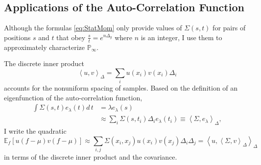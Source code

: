\documentclass[]{article}
\newcommand{\field}[1]{\mathbb{#1}}
\newcommand\Polytope[1]{\field{P}_{#1}}
\newcommand\PolytopeInf{\Polytope{\infty}}
\newcommand{\EV}[2]{\field{E}_{#1}\left[#2\right]}
\newcommand\inner[2]{\left<#1,#2\right>}
\newcommand\logx{y}
\begin{document}
\subsection{Applications of the Auto-Correlation Function}
\label{sec:acf}

Although the formulas \eqref{eq:StatMom} only provide values of
$\Sigma(s,t)$ for pairs of positions $s$ and $t$ that obey
$\frac{s}{t} = e^{n\Delta_\logx }$ where $n$ is an integer, I use them to
approximately characterize $\PolytopeInf$.

The discrete inner product
\begin{equation}
  \label{eq:inner}
  \inner{u}{v}_\Delta = \sum_i u(x_i) v(x_i) \Delta_i
\end{equation}
accounts for the nonuniform spacing of samples.  Based on the
definition of an eigenfunction of the auto-correlation function,
\begin{align*}
  \int \Sigma(s,t) e_\lambda(t) d\, t &= \lambda e_\lambda(s) \\
  &\approx \sum_i \Sigma(s,t_i) \Delta_i e_\lambda(t_i) \equiv \inner{
    \Sigma}{e_\lambda}_\Delta,
\end{align*}
I write the quadratic
\begin{equation}
  \label{eq:Quad}
  \EV{f}{u(f-\mu)v(f-\mu)} \approx \sum_{i,j} \Sigma(x_i,x_j) u(x_i)
  v(x_j) \Delta_i \Delta_j = \inner{u}{ \inner{\Sigma}{v }_\Delta
  }_\Delta
\end{equation}
in terms of the discrete inner product and the covariance.
\end{document}
